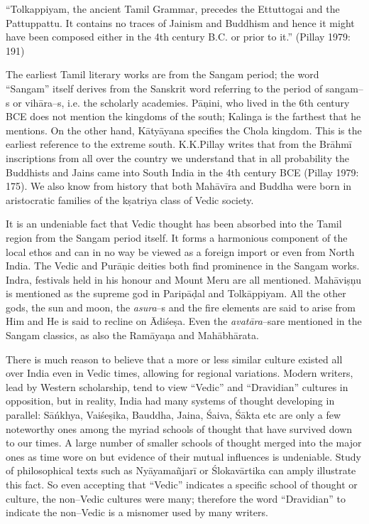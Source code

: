 \begin{myquote}
“Tolkappiyam, the ancient Tamil Grammar, precedes the Ettuttogai and the Pattuppattu. It contains no traces of Jainism and Buddhism and hence it might have been composed either in the 4th century B.C. or prior to it.” (Pillay 1979: 191)
\end{myquote}

The earliest Tamil literary works are from the Sangam period; the word “Sangam” itself derives from the Sanskrit word referring to the period of sangam–s or vihāra–s, i.e. the scholarly academies. Pāņini, who lived in the 6th century BCE does not mention the kingdoms of the south; Kalinga is the farthest that he mentions. On the other hand, Kātyāyana specifies the Chola kingdom. This is the earliest reference to the extreme south. K.K.Pillay writes that from the Brāhmī inscriptions from all over the country we understand that in all probability the Buddhists and Jains came into South India in the 4th century BCE (Pillay 1979: 175). We also know from history that both Mahāvīra and Buddha were born in aristocratic families of the kṣatriya class of Vedic society.

It is an undeniable fact that Vedic thought has been absorbed into the Tamil region from the Sangam period itself. It forms a harmonious component of the local ethos and can in no way be viewed as a foreign import or even from North India. The Vedic and Purāņic deities both find prominence in the Sangam works. Indra, festivals held in his honour and Mount Meru are all mentioned. Mahāviṣņu is mentioned as the supreme god in Paripāḍal and Tolkāppiyam. All the other gods, the sun and moon, the \textit{asura}–s and the fire elements are said to arise from Him and He is said to recline on Ādiśeṣa. Even the \textit{avatāra}–s\break are mentioned in the Sangam classics, as also the Ramāyaņa and Mahābhārata.

There is much reason to believe that a more or less similar culture existed all over India even in Vedic times, allowing for regional variations. Modern writers, lead by Western scholarship, tend to view “Vedic” and “Dravidian” cultures in opposition, but in reality, India had many systems of thought developing in parallel: Sāńkhya, Vaiśeṣika, Bauddha, Jaina, Śaiva, Śākta etc are only a few noteworthy ones among the myriad schools of thought that have survived down to our times. A large number of smaller schools of thought merged into the major ones as time wore on but evidence of their mutual influences is undeniable. Study of philosophical texts such as Nyāyamañjarī or Ślokavārtika can amply illustrate this fact. So even accepting that “Vedic” indicates a specific school of thought or culture, the non–Vedic cultures were many; therefore the word “Dravidian” to indicate the non–Vedic is a misnomer used by many writers.

